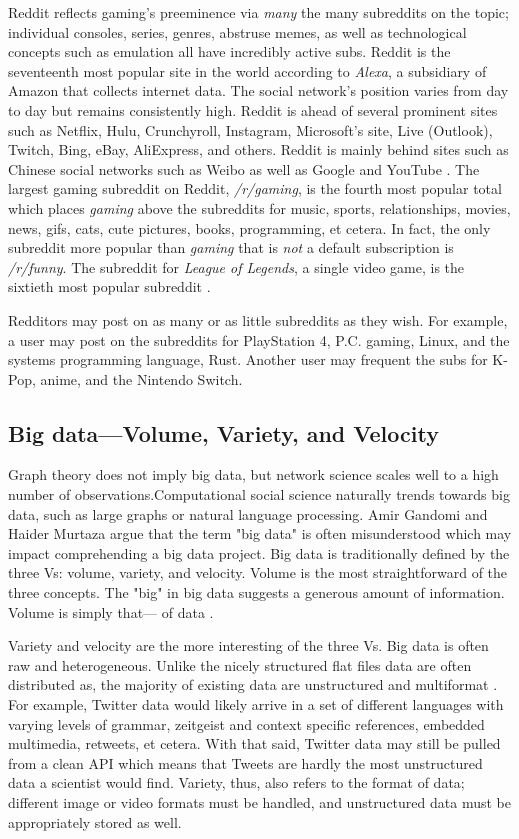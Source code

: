 \documentclass[12pt, a4paper]{article}
\begin{document}
Reddit reflects gaming's preeminence via \textit{many} the many subreddits on the topic; individual consoles, series, genres, abstruse memes, as well as technological concepts such as emulation all have incredibly active subs. Reddit is the seventeenth most popular site in the world according to \textit{Alexa}, a subsidiary of Amazon that collects internet data. The social network's position varies from day to day but remains consistently high. Reddit is ahead of several prominent sites such as Netflix, Hulu, Crunchyroll, Instagram, Microsoft's site, Live (Outlook), Twitch, Bing, eBay, AliExpress, and others. Reddit is mainly behind sites such as Chinese social networks such as Weibo as well as Google and YouTube \cite{alexatop}. The largest gaming subreddit on Reddit, \textit{/r/gaming}, is the fourth most popular total which places \textit{gaming} above the subreddits for music, sports, relationships, movies, news, gifs, cats, cute pictures, books, programming, et cetera. In fact, the only subreddit more popular than \textit{gaming} that is \textit{not} a default subscription is \textit{/r/funny}. The subreddit for \textit{League of Legends}, a single video game, is the sixtieth most popular subreddit \cite{redditlist}.

Redditors may post on as many or as little subreddits as they wish. For example, a user may post on the subreddits for PlayStation 4, P.C. gaming, Linux, and the systems programming language, Rust. Another user may frequent the subs for K-Pop, anime, and the Nintendo Switch.

\subsection{Big data---Volume, Variety, and Velocity}
Graph theory does not imply big data, but network science scales well to a high number of observations.Computational social science naturally trends towards big data, such as large graphs or natural language processing. Amir Gandomi and Haider Murtaza argue that the term "big data" is often misunderstood which may impact comprehending a big data project. Big data is traditionally defined by the three Vs: volume, variety, and velocity. Volume is the most straightforward of the three concepts. The "big" in big data suggests a generous amount of information. Volume is simply that--- of data \cite{gandomiamir2015}.

Variety and velocity are the more interesting of the three Vs. Big data is often raw and heterogeneous. Unlike the nicely structured flat files data are often distributed as, the majority of existing data are unstructured and multiformat \cite{gandomiamir2015}. For example, Twitter data would likely arrive in a set of different languages with varying levels of grammar, zeitgeist and context specific references, embedded multimedia, retweets, et cetera. With that said, Twitter data may still be pulled from a clean API which means that Tweets are hardly the most unstructured data a scientist would find. Variety, thus, also refers to the format of data; different image or video formats must be handled, and unstructured data must be appropriately stored as well. 
\end{document}

